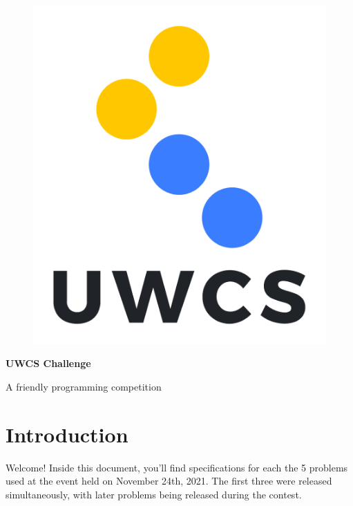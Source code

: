 \documentclass[a4paper,11pt,parskip=half-]{scrartcl}
\begin{document}
\begin{figure}
    \vspace{-10pt} %
    \includegraphics[width=0.8\linewidth]{shield.png} %
    \vspace{-100pt} %
\end{figure}

\normalfont \Huge \bfseries UWCS Challenge

\normalfont\Large A friendly programming competition
\normalsize

\section*{Introduction}

Welcome! 
Inside this document, you'll find specifications for each the 5 problems used at the event held on November 24th, 2021.
The first three were released simultaneously, with later problems being released during the contest.

\tableofcontents

\newpage



\newpage

\newpage

\newpage

\newpage






% 
% 
% 
% 
% 
\end{document}
